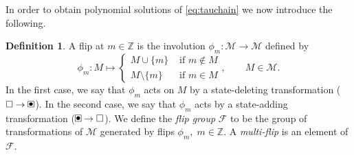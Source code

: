 \documentclass{amsart}
\theoremstyle{definition}
\newtheorem{definition}{Definition}
\newcommand{\Z}{\mathbb{Z}}
\newcommand{\cF}{\mathcal{F}}
\newcommand{\cM}{\mathcal{M}}
\renewcommand{\boxdot}{{\ \clap{\raise0.25ex\hbox{$\bullet$}}\clap{$\square$}\ }}
\newcommand{\emptybox}{\hbox{$\square$}}
\begin{document}
In order to obtain polynomial solutions of \eqref{eq:tauchain} we now
introduce the following.

\begin{definition}
  A flip at $m\in \Z$ is the involution $\phi_m:\cM\to \cM$ defined by
\begin{equation}\label{eq:flipdef}
 \phi_m : M \mapsto
\begin{cases}
   M \cup \{ m \} & \text{ if } m\notin M \\
   M \setminus \{ m \} & \text{ if } m\in M 
\end{cases},\qquad M\in \cM.
\end{equation}
In the first case, we say that $\phi_m$ acts on $M$ by a
state-deleting transformation ($\emptybox\to \boxdot$).  In the second
case, we say that $\phi_m$ acts by a state-adding transformation
($\boxdot\to\emptybox$).  We define the \emph{flip group} $\cF$ to be
the group of transformations of $\cM$ generated by flips
$\phi_m,\; m\in \Z$.  A \emph{multi-flip} is an element of $\cF$.
\end{definition}
\end{document}
